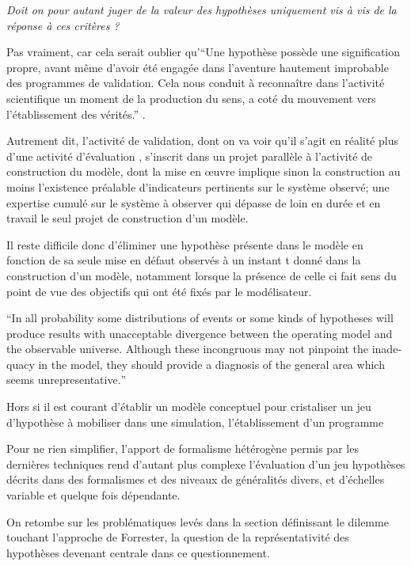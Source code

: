 \textit{Doit on pour autant juger de la valeur des hypothèses uniquement vis à vis de la réponse à ces critères ?}

Pas vraiment, car cela serait oublier qu'\enquote{Une hypothèse possède une signification propre, avant même d’avoir été engagée dans l’aventure hautement improbable des programmes de validation. Cela nous conduit à reconnaître dans l’activité scientifique un moment de la production du sens, a coté du mouvement vers l’établissement des vérités.} \autocite[17]{Besse2000}.

Autrement dit, l'activité de validation, dont on va voir qu'il s'agit en réalité plus d'une activité d'évaluation \autocite{Amblard2006}, s'inscrit dans un projet parallèle à l'activité de construction du modèle, dont la mise en œuvre implique sinon la construction au moins l'existence préalable d'indicateurs pertinents sur le système observé; une expertise cumulé sur le système à observer qui dépasse de loin en durée et en travail le seul projet de construction d'un modèle.

Il reste difficile donc d'éliminer une hypothèse présente dans le modèle en fonction de sa seule mise en défaut observés à un instant t donné dans la construction d'un modèle, notamment lorsque la présence de celle ci fait sens du point de vue des objectifs qui ont été fixés par le modélisateur.

\foreignquote{english}{In all probability some distributions of events or some kinds of hypotheses will produce results with unacceptable divergence between the operating model and the observable universe. Although these incongruous may not pinpoint the inadequacy in the model, they should provide a diagnosis of the general area which seems unrepresentative.}

Hors si il est courant d'établir un modèle conceptuel pour cristaliser un jeu d'hypothèse à mobiliser dans une simulation, l'établissement d'un programme 


Pour ne rien simplifier, l'apport de formalisme hétérogène permis par les dernières techniques rend d'autant plus complexe l'évaluation d'un jeu hypothèses décrits dans des formalismes et des niveaux de généralités divers, et d'échelles variable et quelque fois dépendante.



On retombe sur les problématiques levés dans la section définissant le dilemme touchant l'approche de Forrester, la question de la représentativité des hypothèses devenant centrale dans ce questionnement.


